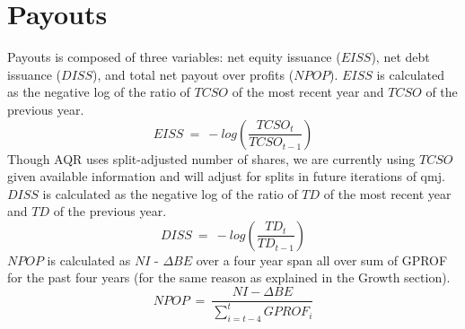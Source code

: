 \documentclass[12pt]{article}
\begin{document}
\section*{Payouts}
Payouts is composed of three variables: net equity issuance ($EISS$), net debt issuance ($DISS$), and total net payout over profits ($NPOP$). $EISS$ is calculated as the negative log of the ratio of $TCSO$ of the most recent year and $TCSO$ of the previous year. $$EISS \ = \ -log(\frac{TCSO_t}{TCSO_{t-1}})$$ Though AQR uses split-adjusted number of shares, we are currently using $TCSO$ given available information and will adjust for splits in future iterations of qmj. $DISS$ is calculated as the negative log of the ratio of $TD$ of the most recent year and $TD$ of the previous year. $$DISS \ = \ -log(\frac{TD_t}{TD_{t-1}})$$ $NPOP$ is calculated as $NI$ - $\Delta BE$ over a four year span all over sum of GPROF for the past four years (for the same reason as explained in the Growth section). $$NPOP \ = \ \frac{NI - \Delta BE}{\sum_{i=t-4}^{t}GPROF_i}$$
\end{document}
